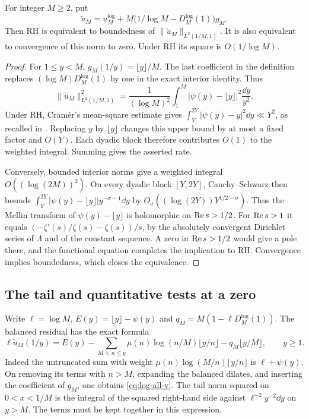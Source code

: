 \begin{proposition}\label{prop:interior}
For integer \(M\ge2\), put
\[
 \widetilde u_M=u_M^{\log}
       +M\bigl(1/\log M-D_M^{\log}(1)\bigr)g_M .
\]
Then RH is equivalent to boundedness of \(\|\widetilde u_M\|_{L^2(1/M,1)}\). It is also equivalent to convergence of this norm to zero. Under RH its square is \(O(1/\log M)\).
\end{proposition}
\begin{proof}
For \(1\le y<M\), \(g_M(1/y)=\lfloor y\rfloor/M\). The last coefficient in the definition replaces \((\log M)D_M^{\log}(1)\) by one in the exact interior identity. Thus
\[
 \|\widetilde u_M\|_{L^2(1/M,1)}^2
   =\frac{1}{(\log M)^2}\int_1^M
           |\psi(y)-\lfloor y\rfloor|^2\frac{\dd y}{y^2}.
\]
Under RH, Cram\'er's mean-square estimate gives
\(\int_Y^{2Y}|\psi(y)-y|^2\dd y\ll Y^2\), as recalled in \cite{bpt}. Replacing \(y\) by \(\lfloor y\rfloor\) changes this upper bound by at most a fixed factor and \(O(Y)\). Each dyadic block therefore contributes \(O(1)\) to the weighted integral. Summing gives the asserted rate.

Conversely, bounded interior norms give a weighted integral \(O((\log(2M))^2)\). On every dyadic block \([Y,2Y]\), Cauchy--Schwarz then bounds \(\int_Y^{2Y}|\psi(y)-\lfloor y\rfloor|y^{-\sigma-1}\dd y\) by \(O_\sigma((\log(2Y))Y^{1/2-\sigma})\). Thus the Mellin transform of \(\psi(y)-\lfloor y\rfloor\) is holomorphic on \(\operatorname{Re} s>1/2\). For \(\operatorname{Re} s>1\) it equals \((-\zeta'(s)/\zeta(s)-\zeta(s))/s\), by the absolutely convergent Dirichlet series of \(\Lambda\) and of the constant sequence. A zero in \(\operatorname{Re} s>1/2\) would give a pole there, and the functional equation completes the implication to RH. Convergence implies boundedness, which closes the equivalence.
\end{proof}

\subsection{The tail and quantitative tests at a zero}

Write \(\ell=\log M\), \(E(y)=\lfloor y\rfloor-\psi(y)\) and
\(q_M=M(1-\ell D_M^{\log}(1))\). The balanced residual has the exact formula
\begin{equation}\label{eq:log-all-y}
 \ell\widetilde u_M(1/y)=E(y)
 -\sum_{M<n\le y}\mu(n)\log(n/M)\lfloor y/n\rfloor
 -q_M\lfloor y/M\rfloor,\qquad y\ge1.
\end{equation}
Indeed the untruncated sum with weight \(\mu(n)\log(M/n)\lfloor y/n\rfloor\) is
\(\ell+\psi(y)\). On removing its terms with \(n>M\), expanding the balanced dilates, and inserting the coefficient of \(g_M\), one obtains \eqref{eq:log-all-y}. The tail norm squared on \(0<x<1/M\) is the integral of the squared right-hand side against \(\ell^{-2}y^{-2}\dd y\) on \(y>M\). The terms must be kept together in this expression.

